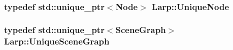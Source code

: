 \hypertarget{namespaceLarp_ad95a88bc34f8c78cefd64c9bbeb94a58}{
\subsubsection[{Unique\-Node}]{\setlength{\rightskip}{0pt plus 5cm}typedef std\-::unique\-\_\-ptr$<${\bf Node}$>$ {\bf Larp\-::\-Unique\-Node}}}\label{namespaceLarp_ad95a88bc34f8c78cefd64c9bbeb94a58}
\hypertarget{namespaceLarp_a81a0d129ec1fc8f1f9fa231fbba6b19b}{
\subsubsection[{Unique\-Scene\-Graph}]{\setlength{\rightskip}{0pt plus 5cm}typedef std\-::unique\-\_\-ptr$<${\bf Scene\-Graph}$>$ {\bf Larp\-::\-Unique\-Scene\-Graph}}}\label{namespaceLarp_a81a0d129ec1fc8f1f9fa231fbba6b19b}
